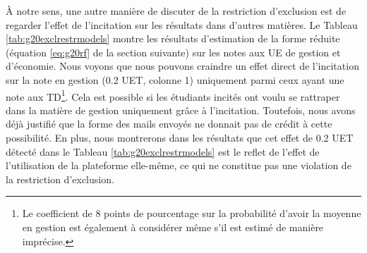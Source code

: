 \documentclass[
]{book}
\begin{document}
À notre sens, une autre manière de discuter de la restriction d'exclusion est de regarder l'effet de l'incitation sur les résultats dans d'autres matières. Le Tableau \ref{tab:g20exclrestrmodels} montre les résultats d'estimation de la forme réduite (équation \ref{eq:g20rf} de la section suivante) sur les notes aux UE de gestion et d'économie. Nous voyons que nous pouvons craindre un effet direct de l'incitation sur la note en gestion (0.2 UET, colonne 1) uniquement parmi ceux ayant une note aux TD\footnote{Le coefficient de 8 points de pourcentage sur la probabilité d'avoir la moyenne en gestion est également à considérer même s'il est estimé de manière imprécise.}. Cela est possible si les étudiants incités ont voulu se rattraper dans la matière de gestion uniquement grâce à l'incitation. Toutefois, nous avons déjà justifié que la forme des mails envoyés ne donnait pas de crédit à cette possibilité. En plus, nous montrerons dans les résultats que cet effet de 0.2 UET détecté dans le Tableau \ref{tab:g20exclrestrmodels} est le reflet de l'effet de l'utilisation de la plateforme elle-même, ce qui ne constitue pas une violation de la restriction d'exclusion.
\end{document}
